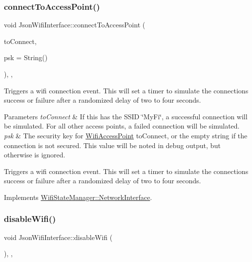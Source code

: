 \subsubsection{\texorpdfstring{connect\+To\+Access\+Point()}{connectToAccessPoint()}}
{\footnotesize\ttfamily void Json\+Wifi\+Interface\+::connect\+To\+Access\+Point (\begin{DoxyParamCaption}\item[{\mbox{\hyperlink{classWifiAccessPoint_ad18977f884076774803027efbaa131a0}{Wifi\+Access\+Point\+::\+Ptr}}}]{to\+Connect,  }\item[{String}]{psk = {\ttfamily String()} }\end{DoxyParamCaption})\hspace{0.3cm}{\ttfamily [override]}, {\ttfamily [protected]}, {\ttfamily [virtual]}}

Triggers a wifi connection event. This will set a timer to simulate the connection\textquotesingle{}s success or failure after a randomized delay of two to four seconds.


\begin{DoxyParams}{Parameters}
{\em to\+Connect} & If this has the S\+S\+ID \char`\"{}\+My\+Fi\char`\"{}, a successful connection will be simulated. For all other access points, a failed connection will be simulated.\\
\hline
{\em psk} & The security key for \mbox{\hyperlink{classWifiAccessPoint}{Wifi\+Access\+Point}} to\+Connect, or the empty string if the connection is not secured. This value will be noted in debug output, but otherwise is ignored.\\
\hline
\end{DoxyParams}
Triggers a wifi connection event. This will set a timer to simulate the connection\textquotesingle{}s success or failure after a randomized delay of two to four seconds. 

Implements \mbox{\hyperlink{classWifiStateManager_1_1NetworkInterface_a5c8a6cb7df8aaf53a0ebdf56aefc5080}{Wifi\+State\+Manager\+::\+Network\+Interface}}.

\mbox{\label{classJsonWifiInterface_a076d1c4d0830aad955a77c4ff46a15f7}} 
\subsubsection{\texorpdfstring{disable\+Wifi()}{disableWifi()}}
{\footnotesize\ttfamily void Json\+Wifi\+Interface\+::disable\+Wifi (\begin{DoxyParamCaption}{ }\end{DoxyParamCaption})\hspace{0.3cm}{\ttfamily [override]}, {\ttfamily [protected]}, {\ttfamily [virtual]}}

